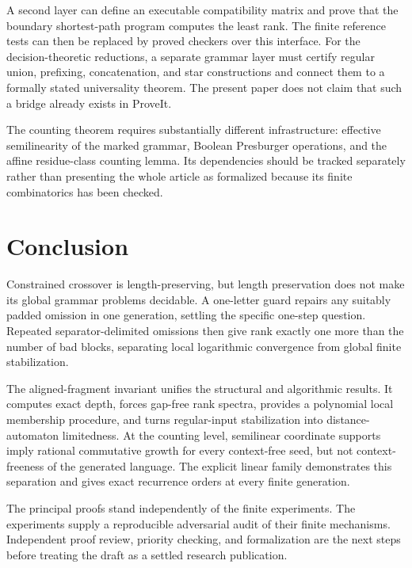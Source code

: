 \documentclass[11pt,letterpaper]{article}
\theoremstyle{definition}
\theoremstyle{remark}
\begin{document}
A second layer can define an executable compatibility matrix and prove that
the boundary shortest-path program computes the least rank. The finite
reference tests can then be replaced by proved checkers over this interface.
For the decision-theoretic reductions, a separate grammar layer must certify
regular union, prefixing, concatenation, and star constructions and connect
them to a formally stated universality theorem. The present paper does not
claim that such a bridge already exists in ProveIt.

The counting theorem requires substantially different infrastructure:
effective semilinearity of the marked grammar, Boolean Presburger operations,
and the affine residue-class counting lemma. Its dependencies should be
tracked separately rather than presenting the whole article as formalized
because its finite combinatorics has been checked.

\section{Conclusion}

Constrained crossover is length-preserving, but length preservation does not
make its global grammar problems decidable. A one-letter guard repairs any
suitably padded omission in one generation, settling the specific one-step
question. Repeated separator-delimited omissions then give rank exactly one
more than the number of bad blocks, separating local logarithmic convergence
from global finite stabilization.

The aligned-fragment invariant unifies the structural and algorithmic
results. It computes exact depth, forces gap-free rank spectra, provides a
polynomial local membership procedure, and turns regular-input stabilization
into distance-automaton limitedness. At the counting level, semilinear
coordinate supports imply rational commutative growth for every context-free
seed, but not context-freeness of the generated language. The explicit linear
family demonstrates this separation and gives exact recurrence orders at
every finite generation.

The principal proofs stand independently of the finite experiments. The
experiments supply a reproducible adversarial audit of their finite
mechanisms. Independent proof review, priority checking, and formalization
are the next steps before treating the draft as a settled research publication.
\end{document}
